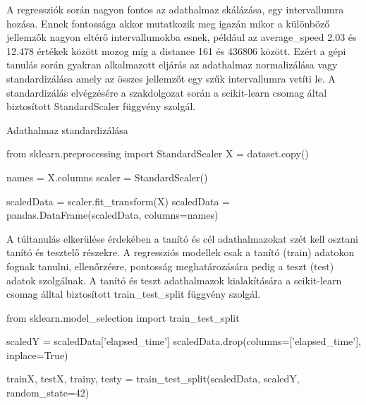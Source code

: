 A regressziók során nagyon fontos az adathalmaz skálázása, egy intervallumra hozása. Ennek fontossága akkor mutatkozik meg igazán mikor a különböző jellemzők nagyon eltérő intervallumokba esnek, például az average\_speed 2.03 és 12.478 értékek között mozog míg a distance 161 és 436806 között. Ezért a gépi tanulás során gyakran alkalmazott eljárás az adathalmaz normalizálása vagy standardizálása amely az összes jellemzőt egy szűk intervallumra vetíti le. A standardizálás elvégzésére a szakdolgozat során a scikit-learn csomag által biztosított StandardScaler függvény szolgál.

\begin{programreszlet}   
	Adathalmaz standardizálása	
\begin{python}
from sklearn.preprocessing import StandardScaler
X = dataset.copy()
		
names = X.columns
scaler = StandardScaler()
		
scaledData = scaler.fit_transform(X)
scaledData = pandas.DataFrame(scaledData, columns=names)
\end{python}
\label{prog:elapsedStandard}
\end{programreszlet}

\begin{programreszlet} A túltanulás elkerülése érdekében a tanító és cél adathalmazokat szét kell osztani tanító és tesztelő részekre. A regressziós modellek csak a tanító (train) adatokon fognak tanulni, ellenőrzésre, pontosság meghatározására pedig a teszt (test) adatok szolgálnak. A tanító és teszt adathalmazok kialakítására a scikit-learn csomag álltal biztosított train\_test\_split függvény szolgál.
\begin{python}
from sklearn.model_selection import train_test_split
		
scaledY = scaledData['elapsed_time']
scaledData.drop(columns=['elapsed_time'], inplace=True)
		
trainX, testX, trainy, testy = train_test_split(scaledData, scaledY, 
						random_state=42)
\end{python}
\label{prog:elapsedTrainTestSplit}
\end{programreszlet}

